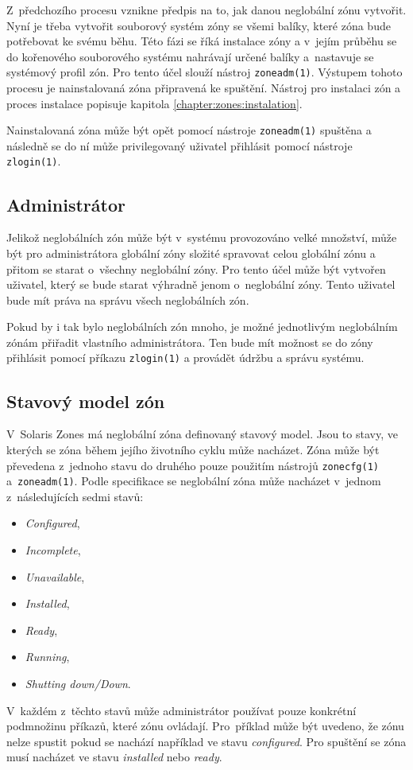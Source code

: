 Z~předchozího procesu vznikne předpis na to, jak danou neglobální zónu vytvořit. Nyní je třeba vytvořit souborový systém
zóny se všemi balíky, které zóna bude potřebovat ke svému běhu. Této fázi se říká instalace zóny a v~jejím průběhu se do
kořenového souborového systému nahrávají určené balíky a~nastavuje se systémový profil zón. Pro tento účel slouží nástroj
\verb|zoneadm(1)|. Výstupem tohoto procesu je nainstalovaná zóna připravená ke spuštění. Nástroj pro instalaci zón
a proces instalace popisuje kapitola \ref{chapter:zones:instalation}.

Nainstalovaná zóna může být opět pomocí nástroje \verb|zoneadm(1)| spuštěna a následně se do ní může privilegovaný 
uživatel přihlásit pomocí nástroje \verb|zlogin(1)|.
\subsection{Administrátor}
\label{chapter:zones:administration:administrator}
Jelikož neglobálních zón může být v~systému provozováno velké množství, může být pro administrátora globální zóny složité spravovat 
celou globální zónu a přitom se starat o~všechny neglobální zóny. Pro tento účel může být vytvořen uživatel, který se bude
starat výhradně jenom o~neglobální zóny. Tento uživatel bude mít práva na správu všech neglobálních zón.

Pokud by i tak bylo neglobálních zón mnoho, je možné jednotlivým neglobálním zónám přiřadit vlastního administrátora. Ten
bude mít možnost se do zóny přihlásit pomocí příkazu \verb|zlogin(1)| a provádět údržbu a správu systému.
\subsection{Stavový model zón}
\label{chapter:zones:administration:states}
V~Solaris Zones má neglobální zóna definovaný stavový model. Jsou to stavy, ve kterých se zóna během jejího životního cyklu
může nacházet. Zóna může být převedena z~jednoho stavu do druhého pouze použitím nástrojů \verb|zonecfg(1)| a~\verb|zoneadm(1)|.
Podle specifikace \cite{oracle:solaris:zones:states} se neglobální zóna může nacházet v~jednom
z~následujících sedmi stavů:
\begin{itemize}
 \item \textit{Configured},
 \item \textit{Incomplete},
 \item \textit{Unavailable},
 \item \textit{Installed},
 \item \textit{Ready},
 \item \textit{Running},
 \item \textit{Shutting down/Down}.
\end{itemize}
V~každém z~těchto stavů může administrátor používat pouze konkrétní podmnožinu příkazů, které zónu ovládají. Pro~příklad
může být uvedeno, že zónu nelze spustit pokud se nachází například ve stavu \textit{configured}. Pro spuštění se zóna musí
nacházet ve stavu \textit{installed} nebo \textit{ready}.
